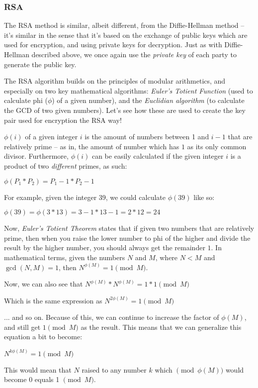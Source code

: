 \subsubsection[RSA]{RSA}
The RSA method is similar, albeit different, from the Diffie-Hellman method -- it's similar in the sense that it's based on the exchange of public keys which are used for encryption, and using private keys for decryption.
Just as with Diffie-Hellman described above, we once again use the \textit{private key} of each party to generate the public key.

The RSA algorithm builds on the principles of modular arithmetics, and especially on two key mathematical algorithms: \textit{Euler's Totient Function} (used to calculate phi ($\phi$) of a given number), and the \textit{Euclidian algorithm} (to calculate the GCD of two given numbers). Let's see how these are used to create the key pair used for encryption the RSA way!

$\phi(i)$ of a given integer $i$ is the amount of numbers between 1 and $i-1$ that are relatively prime -- as in, the amount of number which has $1$ as its only common divisor. Furthermore, $\phi(i)$ can be easily calculated if the given integer $i$ is a product of two \textit{different} primes, as such:

$\phi(P_1*P_2) = P_1-1 * P_2-1$


For example, given the integer 39, we could calculate $\phi(39)$ like so:

$\phi(39) = \phi(3*13) = 3-1 * 13-1 = 2 * 12 = 24$

Now, \textit{Euler's Totient Theorem} states that if given two numbers that are relatively prime, then when you raise the lower number to phi of the higher and divide the result by the higher number, you should always get the remainder $1$. 
In mathematical terms, given the numbers $N$ and $M$, where $N<M$ and $\gcd(N,M)=1$, then $N^{\phi(M)} = 1 \pmod{M}$.

Now, we can also see that
$N^{\phi(M)} * N^{\phi(M)} = 1 * 1 \pmod{M}$

Which is the same expression as 
$N^{2\phi(M)} = 1 \pmod{M}$

... and so on. Because of this, we can continue to increase the factor of $\phi(M)$, and still get $1 \pmod{M}$ as the result. This means that we can generalize this equation a bit to become:

$N^{k\phi(M)} = 1 \pmod{M}$

This would mean that $N$ raised to any number $k$ which $\pmod{\phi(M)}$ would become 0 equals 1 $\pmod{M}$.

